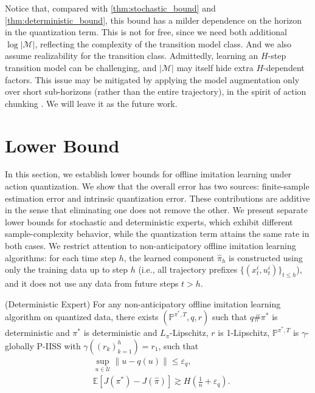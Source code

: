 \documentclass{article}
\begin{document}
Notice that, compared with \cref{thm:stochastic_bound} and \cref{thm:deterministic_bound}, this bound has a milder dependence on the horizon in the quantization term. This is not for free, since we need both additional $\log|\mathcal M|$, reflecting the complexity of the transition model class. And we also assume realizability for the transition class. Admittedly, learning an $H$-step transition model can be challenging, and $|\mathcal M|$ may itself hide extra $H$-dependent factors. This issue may be mitigated by applying the model augmentation only over short sub-horizons (rather than the entire trajectory), in the spirit of action chunking \citep{zhao2023learning}. We will leave it as the future work. 


\section{Lower Bound}\label{sec:lower_bound}
In this section, we establish lower bounds for offline imitation learning under action quantization. We show that the overall error has two sources: finite-sample estimation error and intrinsic quantization error. These contributions are additive in the sense that eliminating one does not remove the other. We present separate lower bounds for stochastic and deterministic experts, which exhibit different sample-complexity behavior, while the quantization term attains the same rate in both cases. We restrict attention to non-anticipatory offline imitation learning algorithms: for each time step $h$, the learned component $\hat\pi_h$ is constructed using only the training data up to step $h$ (i.e., all trajectory prefixes $\{(x_t^i,u_t^i)\}_{t\le h}$), and it does not use any data from future steps $t>h$. 



\begin{theorem}\label{thm:lb_deterministic_expert}\textnormal{(Deterministic Expert)}
    For any non-anticipatory offline imitation learning algorithm on quantized data, there exists $(\mathbb P^{\pi^*, T}, q, r)$ such that $q\#\pi^*$ is deterministic and $\pi^*$ is deterministic and $L_\pi$-Lipschitz, $r$ is 1-Lipschitz, $\mathbb P^{\pi^*,T}$ is $\gamma$-globally P-IISS with $\gamma((r_k)_{k=1}^h)=r_1$, such that
    \begin{align*}
        &\sup_{u\in\mathcal U} \|u-q(u)\| \leq \varepsilon_q, \\
        &\mathbb E[J(\pi^*)- J(\hat \pi)]\gtrsim H(\frac{1}{n}+\varepsilon_q).
    \end{align*}
\end{theorem}
\end{document}
